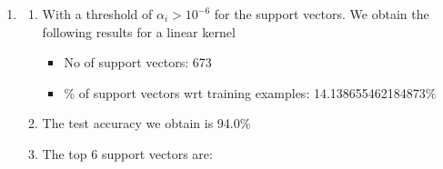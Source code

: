 \begin{enumerate}[label=(\alph*)]
    \item \begin{enumerate}[label=\roman*.]
        \item With a threshold of $\alpha_i > 10^{-6}$ for the support vectors. We obtain the following results for a linear kernel
        \begin{itemize}
            \item No of support vectors: 673
            \item \% of support vectors wrt training examples: 14.138655462184873\%
        \end{itemize}
        \item The test accuracy we obtain is 94.0\%
        \item The top 6 support vectors are:


\end{enumerate}
\end{enumerate}

